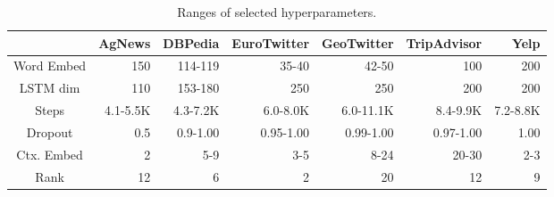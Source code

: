 \begin{table*}[]
\centering
\begin{tabular}{crrrrrr}
\textbf{}  & \textbf{AgNews} & \textbf{DBPedia} & \textbf{EuroTwitter} & \textbf{GeoTwitter} & \textbf{TripAdvisor} & \textbf{Yelp} \\ \hline
Word Embed & 150      & 114-119  & 35-40       & 42-50      & 100         & 200      \\
LSTM dim   & 110      & 153-180  & 250         & 250        & 200         & 200      \\
Steps      & 4.1-5.5K & 4.3-7.2K & 6.0-8.0K    & 6.0-11.1K  & 8.4-9.9K    & 7.2-8.8K \\
Dropout    & 0.5      & 0.9-1.00 & 0.95-1.00   & 0.99-1.00  & 0.97-1.00   & 1.00     \\
Ctx. Embed & 2        & 5-9      & 3-5         & 8-24       & 20-30       & 2-3      \\
Rank       & 12       & 6        & 2           & 20         & 12          & 9       
\end{tabular}
\caption{Ranges of selected hyperparameters.}
\label{table:hyperparams2}
\end{table*}